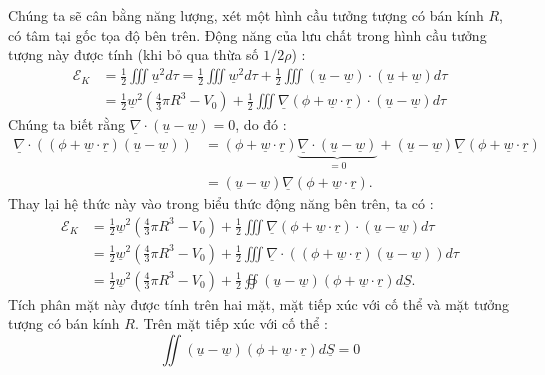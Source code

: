 \documentclass[CO_LUU_CHAT.tex]{subfiles}
\begin{document}
Chúng ta sẽ cân bằng năng lượng, xét một hình cầu tưởng tượng có bán kính $R$, có tâm tại gốc tọa độ bên trên. Động năng của lưu chất trong hình cầu tưởng tượng này được tính (khi bỏ qua thừa số $1/2\rho$) :
$$
\begin{aligned}
	\mathscr{E}_K&=\frac{1}{2}\iiint \underline{u}^2d\tau=\frac{1}{2}\iiint \underline{w}^2d\tau+\frac{1}{2}\iiint \left(\underline{u}-\underline{w}\right)\cdot\left(\underline{u}+\underline{w}\right)d\tau\\
	&=\frac{1}{2}\underline{w}^2\left(\frac{4}{3}\pi R^3-V_0\right)+\frac{1}{2}\iiint \underline{\nabla}\left(\phi+\underline{w}\cdot\underline{r}\right)\cdot\left(\underline{u}-\underline{w}\right)d\tau
\end{aligned}
$$
Chúng ta biết rằng $\underline{\nabla}\cdot\left(\underline{u}-\underline{w}\right)=0$, do đó :
$$
\begin{aligned}
	\underline{\nabla}\cdot\left(\left(\phi+\underline{w}\cdot\underline{r}\right)\left(\underline{u}-\underline{w}\right)\right)&=\left(\phi+\underline{w}\cdot\underline{r}\right)\underbrace{\underline{\nabla}\cdot\left(\underline{u}-\underline{w}\right)}_{=0}+\left(\underline{u}-\underline{w}\right)\underline{\nabla}\left(\phi+\underline{w}\cdot\underline{r}\right)\\
	&=\left(\underline{u}-\underline{w}\right)\underline{\nabla}\left(\phi+\underline{w}\cdot\underline{r}\right).
\end{aligned}
$$
Thay lại hệ thức này vào trong biểu thức động năng bên trên, ta có :
$$
\begin{aligned}
	\mathscr{E}_K&=\frac{1}{2}\underline{w}^2\left(\frac{4}{3}\pi R^3-V_0\right)+\frac{1}{2}\iiint\underline{\nabla}\left(\phi+\underline{w}\cdot\underline{r}\right)\cdot\left(\underline{u}-\underline{w}\right)d\tau\\
	&=\frac{1}{2}\underline{w}^2\left(\frac{4}{3}\pi R^3-V_0\right)+\frac{1}{2}\iiint\underline{\nabla}\cdot\left(\left(\phi+\underline{w}\cdot\underline{r}\right)\left(\underline{u}-\underline{w}\right)\right)d\tau\\
	&=\frac{1}{2}\underline{w}^2\left(\frac{4}{3}\pi R^3-V_0\right)+\frac{1}{2}\oiint\left(\underline{u}-\underline{w}\right)\left(\phi+\underline{w}\cdot\underline{r}\right)d\underline{S}.
\end{aligned}
$$
Tích phân mặt này được tính trên hai mặt, mặt tiếp xúc với cố thể và mặt tưởng tượng có bán kính $R$. Trên mặt tiếp xúc với cố thể :
$$
\iint\left(\underline{u}-\underline{w}\right)\left(\phi+\underline{w}\cdot\underline{r}\right)d\underline{S}=0
$$
\end{document}
